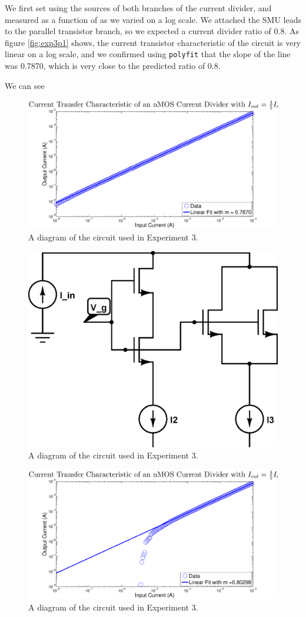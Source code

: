 We first set \Iin using the sources of both branches of the current divider, and measured \Iout as a function of \Iin as we varied \Iin on a log scale. We attached the SMU leads to the parallel transistor branch, so we expected a current divider ratio of 0.8. As figure \ref{fig:exp3p1} shows, the current transistor characteristic of the circuit is very linear on a log scale, and we confirmed using \texttt{polyfit} that the slope of the line was 0.7870, which is very close to the predicted ratio of 0.8.

We can see

\begin{figure}[H]
\centering
\includegraphics[width=\linewidth]{../Figures/Experiment3Figure1.eps}
\caption{A diagram of the circuit used in Experiment 3.}
\label{fig:exp3p2}
\end{figure}

\begin{figure}[H]
\centering
\includegraphics[width=0.65\linewidth]{../Figures/Experiment3CircuitDiagram2.eps}
\caption{A diagram of the circuit used in Experiment 3.}
\label{fig:exp3p2dia}
\end{figure}


\begin{figure}[H]
\centering
\includegraphics[width=\linewidth]{../Figures/Experiment3Figure2.eps}
\caption{A diagram of the circuit used in Experiment 3.}
\label{fig:exp3p2}
\end{figure}